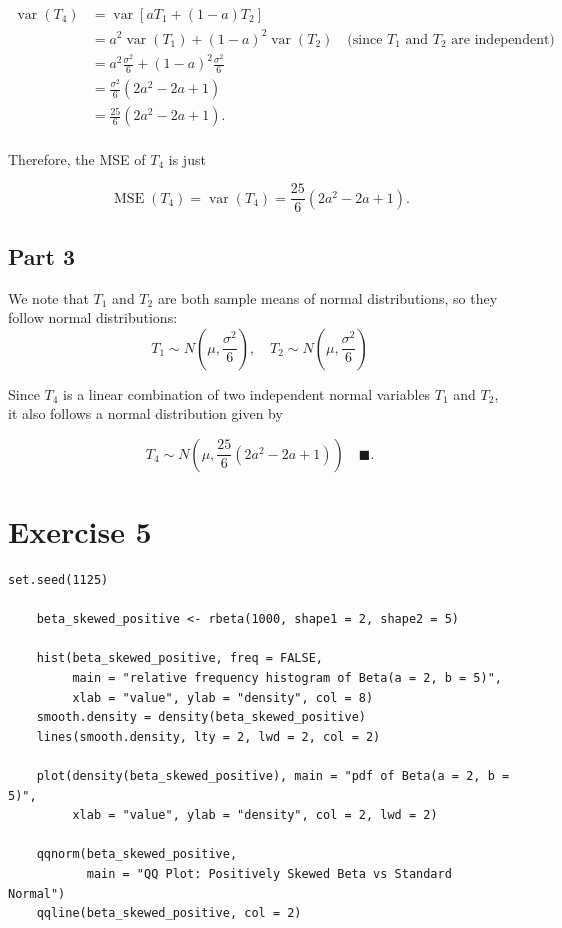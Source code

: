 \documentclass{article}
\begin{document}
$$
\begin{aligned}
\operatorname{var}(T_4) &= \operatorname{var}[aT_1 + (1-a)T_2] \\
&= a^2 \operatorname{var}(T_1) + (1-a)^2 \operatorname{var}(T_2) \quad \text{(since $T_1$ and $T_2$ are independent)} \\
&= a^2 \frac{\sigma^2}{6} + (1-a)^2 \frac{\sigma^2}{6} \\
&= \frac{\sigma^2}{6} (2a^2 - 2a + 1) \\
&= \frac{25}{6} (2a^2 - 2a + 1).
\end{aligned}
$$
\\

Therefore, the MSE of $T_4$ is just

$$
\operatorname{MSE}(T_4) = \operatorname{var}(T_4) = \frac{25}{6} (2a^2 - 2a + 1).
$$

\subsection*{Part 3}

We note that $T_1$ and $T_2$ are both sample means of normal distributions, so they follow normal distributions:
$$
T_1 \sim N\left(\mu, \frac{\sigma^2}{6}\right), \quad T_2 \sim N\left(\mu, \frac{\sigma^2}{6}\right)
$$

Since $T_4$ is a linear combination of two independent normal variables $T_1$ and $T_2$, it also follows a normal distribution given by

$$
T_4 \sim N\left(\mu, \frac{25}{6} (2a^2 - 2a + 1)\right) \quad \blacksquare.
$$


\newpage
\section*{Exercise 5}

\begin{lstlisting}[caption={R code for generating and plotting a positively skewed Beta distribution}]
    set.seed(1125)
    
    beta_skewed_positive <- rbeta(1000, shape1 = 2, shape2 = 5)
    
    hist(beta_skewed_positive, freq = FALSE, 
         main = "relative frequency histogram of Beta(a = 2, b = 5)", 
         xlab = "value", ylab = "density", col = 8)
    smooth.density = density(beta_skewed_positive)
    lines(smooth.density, lty = 2, lwd = 2, col = 2)
    
    plot(density(beta_skewed_positive), main = "pdf of Beta(a = 2, b = 5)", 
         xlab = "value", ylab = "density", col = 2, lwd = 2)
    
    qqnorm(beta_skewed_positive, 
           main = "QQ Plot: Positively Skewed Beta vs Standard Normal")
    qqline(beta_skewed_positive, col = 2)
\end{lstlisting}
\end{document}
